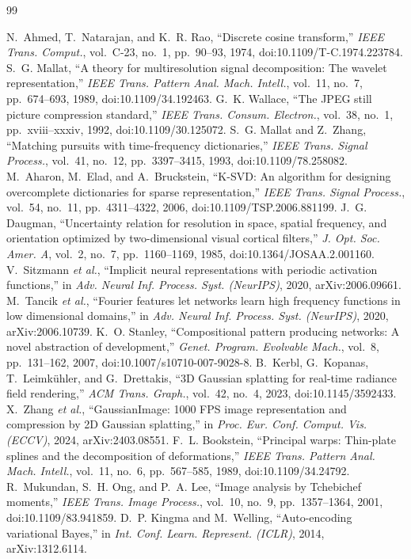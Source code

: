 \documentclass[journal]{IEEEtran}
\begin{document}
\begin{thebibliography}{99}
\itemsep 1pt

 N.~Ahmed, T.~Natarajan, and K.~R. Rao, ``Discrete cosine transform,'' \emph{IEEE
Trans. Comput.}, vol.~C-23, no.~1, pp.~90--93, 1974, doi:10.1109/T-C.1974.223784.
 S.~G. Mallat, ``A theory for multiresolution signal decomposition: The wavelet
representation,'' \emph{IEEE Trans. Pattern Anal. Mach. Intell.}, vol.~11, no.~7, pp.~674--693, 1989,
doi:10.1109/34.192463.
 G.~K. Wallace, ``The JPEG still picture compression standard,'' \emph{IEEE
Trans. Consum. Electron.}, vol.~38, no.~1, pp.~xviii--xxxiv, 1992, doi:10.1109/30.125072.
 S.~G. Mallat and Z.~Zhang, ``Matching pursuits with time-frequency
dictionaries,'' \emph{IEEE Trans. Signal Process.}, vol.~41, no.~12, pp.~3397--3415, 1993,
doi:10.1109/78.258082.
 M.~Aharon, M.~Elad, and A.~Bruckstein, ``K-SVD: An algorithm for designing
overcomplete dictionaries for sparse representation,'' \emph{IEEE Trans. Signal Process.}, vol.~54,
no.~11, pp.~4311--4322, 2006, doi:10.1109/TSP.2006.881199.
 J.~G. Daugman, ``Uncertainty relation for resolution in space, spatial
frequency, and orientation optimized by two-dimensional visual cortical filters,'' \emph{J. Opt.
Soc. Amer. A}, vol.~2, no.~7, pp.~1160--1169, 1985, doi:10.1364/JOSAA.2.001160.
 V.~Sitzmann \emph{et al.}, ``Implicit neural representations with periodic
activation functions,'' in \emph{Adv. Neural Inf. Process. Syst. (NeurIPS)}, 2020, arXiv:2006.09661.
 M.~Tancik \emph{et al.}, ``Fourier features let networks learn high frequency
functions in low dimensional domains,'' in \emph{Adv. Neural Inf. Process. Syst. (NeurIPS)}, 2020,
arXiv:2006.10739.
 K.~O. Stanley, ``Compositional pattern producing networks: A novel abstraction
of development,'' \emph{Genet. Program. Evolvable Mach.}, vol.~8, pp.~131--162, 2007,
doi:10.1007/s10710-007-9028-8.
 B.~Kerbl, G.~Kopanas, T.~Leimk\"uhler, and G.~Drettakis, ``3D Gaussian splatting
for real-time radiance field rendering,'' \emph{ACM Trans. Graph.}, vol.~42, no.~4, 2023,
doi:10.1145/3592433.
 X.~Zhang \emph{et al.}, ``GaussianImage: 1000 FPS image representation
and compression by 2D Gaussian splatting,'' in \emph{Proc. Eur. Conf. Comput. Vis. (ECCV)}, 2024,
arXiv:2403.08551.
 F.~L. Bookstein, ``Principal warps: Thin-plate splines and the decomposition
of deformations,'' \emph{IEEE Trans. Pattern Anal. Mach. Intell.}, vol.~11, no.~6, pp.~567--585,
1989, doi:10.1109/34.24792.
 R.~Mukundan, S.~H. Ong, and P.~A. Lee, ``Image analysis by Tchebichef
moments,'' \emph{IEEE Trans. Image Process.}, vol.~10, no.~9, pp.~1357--1364, 2001,
doi:10.1109/83.941859.
 D.~P. Kingma and M.~Welling, ``Auto-encoding variational Bayes,'' in \emph{Int.
Conf. Learn. Represent. (ICLR)}, 2014, arXiv:1312.6114.

\end{thebibliography}
\end{document}
